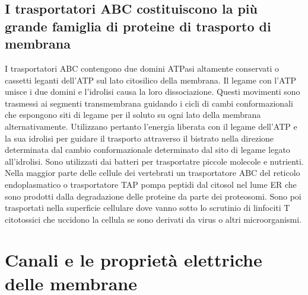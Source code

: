 \subsection{I trasportatori ABC costituiscono la pi\`u grande famiglia di proteine di trasporto di membrana}
I trasportatori ABC contengono due domini ATPasi altamente conservati o cassetti leganti dell'ATP sul lato citosilico della membrana. Il legame con l'ATP unisce i due domini e l'idrolisi
causa la loro dissociazione. Questi movimenti sono trasmessi ai segmenti transmembrana guidando i cicli di cambi conformazionali che espongono siti di legame per il soluto su ogni lato
della membrana alternativamente. Utilizzano pertanto l'energia liberata con il legame dell'ATP e la sua idrolisi per guidare il trasporto attraverso il bistrato nella direzione 
determinata dal cambio conformazionale determinato dal sito di legame legato all'idrolisi. Sono utilizzati dai batteri per trasportatre piccole molecole e nutrienti. Nella maggior parte
delle cellule dei vertebrati un trasportatore ABC del reticolo endoplasmatico o trasportatore TAP pompa peptidi dal citosol nel lume ER che sono prodotti dalla degradazione delle 
proteine da parte dei proteosomi. Sono poi trasportati nella superficie cellulare dove vanno sotto lo scrutinio di linfociti T citotossici che uccidono la cellula se sono derivati da
virus o altri microorganismi. 
\section{Canali e le propriet\`a elettriche delle membrane}

